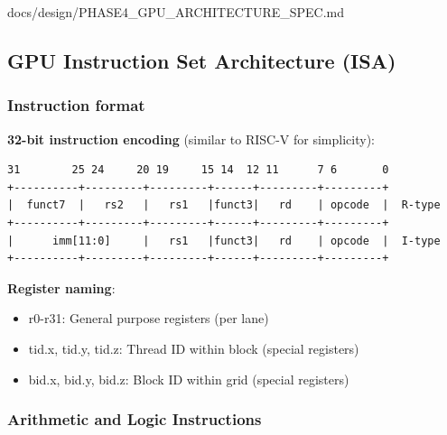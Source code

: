 \begin{relocated}{docs/design/PHASE4_GPU_ARCHITECTURE_SPEC.md}
\subsection{GPU Instruction Set Architecture (ISA)}\label{ds:ch:phase4-gpu-architecture:gpu-instruction-set-architecture-isa}

\subsubsection{Instruction format}\label{ds:ch:phase4-gpu-architecture:instruction-format}

\textbf{32-bit instruction encoding} (similar to RISC-V for simplicity):

\begin{lstlisting}[language={}]
31        25 24     20 19     15 14  12 11      7 6       0
+----------+---------+---------+------+---------+---------+
|  funct7  |   rs2   |   rs1   |funct3|   rd    | opcode  |  R-type
+----------+---------+---------+------+---------+---------+
|      imm[11:0]     |   rs1   |funct3|   rd    | opcode  |  I-type
+----------+---------+---------+------+---------+---------+
\end{lstlisting}

\textbf{Register naming}:

\begin{itemize}
\tightlist
\item
  r0-r31: General purpose registers (per lane)
\item
  tid.x, tid.y, tid.z: Thread ID within block (special registers)
\item
  bid.x, bid.y, bid.z: Block ID within grid (special registers)
\end{itemize}

\subsubsection{Arithmetic and Logic Instructions}\label{ds:ch:phase4-gpu-architecture:arithmetic-and-logic-instructions}


\end{relocated}
